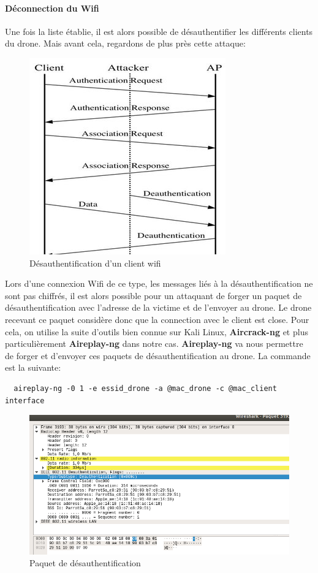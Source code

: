 \paragraph{Déconnection du Wifi}
Une fois la liste établie, il est alors possible de désauthentifier les différents clients du drone. Mais avant cela, regardons de plus près cette attaque:

\begin{figure}[H]
  \centering
  \includegraphics[scale=1.5]{images/deauth}
  \caption{Désauthentification d'un client wifi}
\end{figure}

Lors d'une connexion Wifi de ce type, les messages liés à la désauthentification ne sont pas chiffrés, il est alors possible pour un attaquant de forger un paquet de désauthentification avec l'adresse de la victime et de l'envoyer au drone. Le drone recevant ce paquet considère donc que la connection avec le client est close. Pour cela, on utilise la suite d'outils bien connue sur Kali Linux, \textbf{Aircrack-ng} et plus particulièrement \textbf{Aireplay-ng} dans notre cas. \textbf{Aireplay-ng} va nous permettre de forger et d'envoyer ces paquets de désauthentification au drone. La commande est la suivante:
\begin{verbatim}
  aireplay-ng -0 1 -e essid_drone -a @mac_drone -c @mac_client interface
\end{verbatim}

\begin{figure}[H]
  \centering
  \includegraphics[scale=0.65]{images/wireshark}
  \caption{Paquet de désauthentification}
\end{figure}


